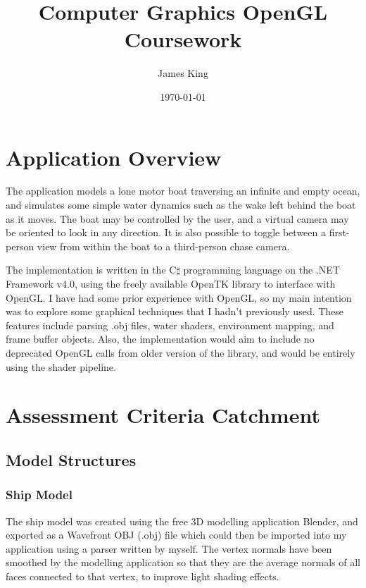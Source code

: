 \documentclass[a4paper,11pt]{article}
\title{Computer Graphics OpenGL Coursework}
\date{\today}
\author{James King}
\begin{document}
\maketitle

\section{Application Overview}
The application models a lone motor boat traversing an infinite and empty ocean, and simulates some simple water dynamics such as the wake left behind the boat as it moves. The boat may be controlled by the user, and a virtual camera may be oriented to look in any direction. It is also possible to toggle between a first-person view from within the boat to a third-person chase camera.

The implementation is written in the C$\sharp$ programming language on the .NET Framework v4.0, using the freely available OpenTK library to interface with OpenGL. I have had some prior experience with OpenGL, so my main intention was to explore some graphical techniques that I hadn't previously used. These features include parsing .obj files, water shaders, environment mapping, and frame buffer objects. Also, the implementation would aim to include no deprecated OpenGL calls from older version of the library, and would be entirely using the shader pipeline.

\section{Assessment Criteria Catchment}
\subsection{Model Structures}
\subsubsection{Ship Model}
The ship model was created using the free 3D modelling application Blender, and exported as a Wavefront OBJ (.obj) file which could then be imported into my application using a parser written by myself. The vertex normals have been smoothed by the modelling application so that they are the average normals of all faces connected to that vertex, to improve light shading effects.
\end{document}
